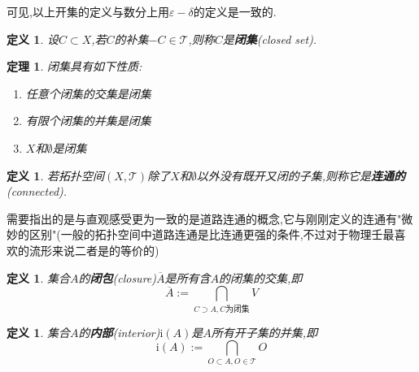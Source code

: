 \documentclass[UTF8]{article}
\newcommand{\im}{\mathrm{i}}
\begin{document}
	可见,以上开集的定义与数分上用$\varepsilon-\delta$的定义是一致的.
	
	\newtheorem*{closedSet}{定义}
	
	\begin{closedSet}
		设$C \subset X$,若$C$的补集$-C \in \mathscr{T}$,则称$C$是\textbf{闭集}(closed set).
	\end{closedSet}
	
	\newtheorem*{closetSetProperty}{定理}
	
	\begin{closetSetProperty}
		
		闭集具有如下性质:
		
		\begin{enumerate}
			
			\item 任意个闭集的交集是闭集
			
			\item 有限个闭集的并集是闭集
			
			\item $X$和$\emptyset$是闭集
			
		\end{enumerate}
		
	\end{closetSetProperty}
	
	\newtheorem*{connected}{定义}
	
	\begin{connected}
		若拓扑空间$(X,\mathscr{T})$除了$X$和$\emptyset$以外没有既开又闭的子集,则称它是\textbf{连通的}(connected).
	\end{connected}
	
	需要指出的是与直观感受更为一致的是道路连通的概念,它与刚刚定义的连通有"微妙的区别"(一般的拓扑空间中道路连通是比连通更强的条件,不过对于物理壬最喜欢的流形来说二者是的等价的)
	
	\newtheorem*{closure}{定义}
	
	\begin{closure}
		集合$A$的\textbf{闭包}(closure)$\overline{A}$是所有含$A$的闭集的交集,即
		\[\overline{A} := \bigcap_{C \supset A, C\text{为闭集}} V\]
	\end{closure}
	
	\newtheorem*{interior}{定义}
	
	\begin{interior}
		集合$A$的\textbf{内部}(interior)$\im(A)$是$A$所有开子集的并集,即
		\[\im(A) := \bigcap_{O \subset A, O \in \mathscr{T}} O\]
	\end{interior}
	
\end{document}
